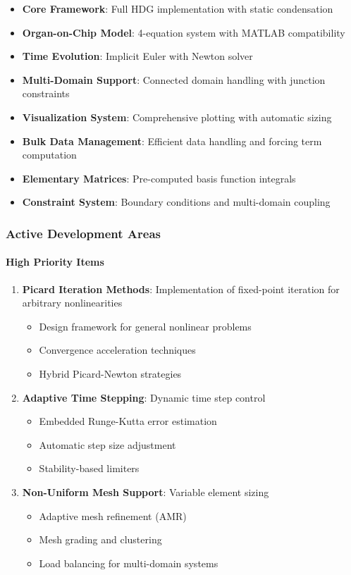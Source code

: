 \begin{itemize}
    \item \textbf{Core Framework}: Full HDG implementation with static condensation
    \item \textbf{Organ-on-Chip Model}: 4-equation system with MATLAB compatibility
    \item \textbf{Time Evolution}: Implicit Euler with Newton solver
    \item \textbf{Multi-Domain Support}: Connected domain handling with junction constraints
    \item \textbf{Visualization System}: Comprehensive plotting with automatic sizing
    \item \textbf{Bulk Data Management}: Efficient data handling and forcing term computation
    \item \textbf{Elementary Matrices}: Pre-computed basis function integrals
    \item \textbf{Constraint System}: Boundary conditions and multi-domain coupling
\end{itemize}

\subsubsection{Active Development Areas}

\paragraph{High Priority Items}
\begin{enumerate}
    \item \textbf{Picard Iteration Methods}: Implementation of fixed-point iteration for arbitrary nonlinearities
    \begin{itemize}
        \item Design framework for general nonlinear problems
        \item Convergence acceleration techniques
        \item Hybrid Picard-Newton strategies
    \end{itemize}
    
    \item \textbf{Adaptive Time Stepping}: Dynamic time step control
    \begin{itemize}
        \item Embedded Runge-Kutta error estimation
        \item Automatic step size adjustment
        \item Stability-based limiters
    \end{itemize}
    
    \item \textbf{Non-Uniform Mesh Support}: Variable element sizing
    \begin{itemize}
        \item Adaptive mesh refinement (AMR)
        \item Mesh grading and clustering
        \item Load balancing for multi-domain systems
    \end{itemize}
\end{enumerate}

